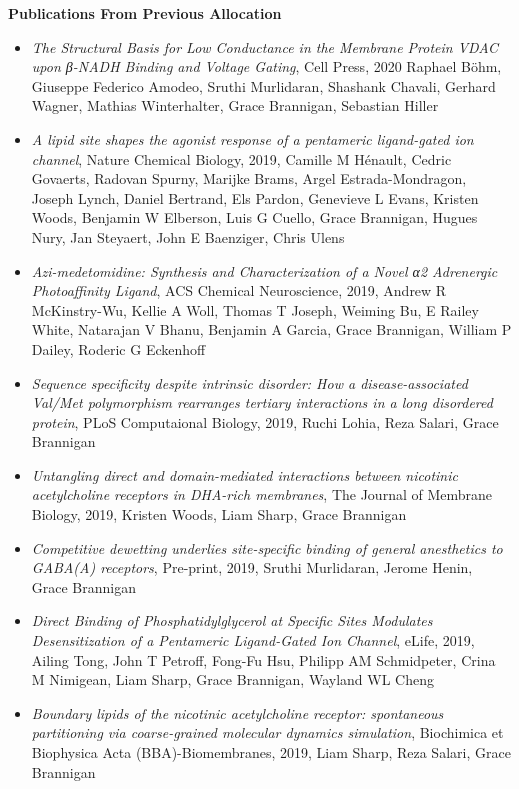 \documentclass[oneside]{report}
\begin{document}
{\bf Publications From Previous Allocation}
\begin{itemize}
    \item \textit{The Structural Basis for Low Conductance in the Membrane Protein VDAC upon β-NADH Binding and Voltage Gating}, Cell Press, 2020 Raphael Böhm, Giuseppe Federico Amodeo, Sruthi Murlidaran, Shashank Chavali, Gerhard Wagner, Mathias Winterhalter, Grace Brannigan, Sebastian Hiller

    \item \textit{A lipid site shapes the agonist response of a pentameric ligand-gated ion channel}, Nature Chemical Biology, 2019, Camille M Hénault, Cedric Govaerts, Radovan Spurny, Marijke Brams, Argel Estrada-Mondragon, Joseph Lynch, Daniel Bertrand, Els Pardon, Genevieve L Evans, Kristen Woods, Benjamin W Elberson, Luis G Cuello, Grace Brannigan, Hugues Nury, Jan Steyaert, John E Baenziger, Chris Ulens

    \item \textit{Azi-medetomidine: Synthesis and Characterization of a Novel α2 Adrenergic Photoaffinity Ligand}, ACS Chemical Neuroscience, 2019, Andrew R McKinstry-Wu, Kellie A Woll, Thomas T Joseph, Weiming Bu, E Railey White, Natarajan V Bhanu, Benjamin A Garcia, Grace Brannigan, William P Dailey, Roderic G Eckenhoff

    \item \textit{Sequence specificity despite intrinsic disorder: How a disease-associated Val/Met polymorphism rearranges tertiary interactions in a long disordered protein}, PLoS Computaional Biology, 2019, Ruchi Lohia, Reza Salari, Grace Brannigan

    \item \textit{Untangling direct and domain-mediated interactions between nicotinic acetylcholine receptors in DHA-rich membranes}, The Journal of Membrane Biology, 2019, Kristen Woods, Liam Sharp, Grace Brannigan

    \item \textit{Competitive dewetting underlies site-specific binding of general anesthetics to GABA(A) receptors}, Pre-print, 2019, Sruthi Murlidaran, Jerome Henin, Grace Brannigan

    \item \textit{Direct Binding of Phosphatidylglycerol at Specific Sites Modulates Desensitization of a Pentameric Ligand-Gated Ion Channel}, eLife, 2019, Ailing Tong, John T Petroff, Fong-Fu Hsu, Philipp AM Schmidpeter, Crina M Nimigean, Liam Sharp, Grace Brannigan, Wayland WL Cheng

    \item \textit{Boundary lipids of the nicotinic acetylcholine receptor: spontaneous partitioning via coarse-grained molecular dynamics simulation}, Biochimica et Biophysica Acta (BBA)-Biomembranes, 2019, Liam Sharp, Reza Salari, Grace Brannigan
\end{itemize} \\
\end{document}
